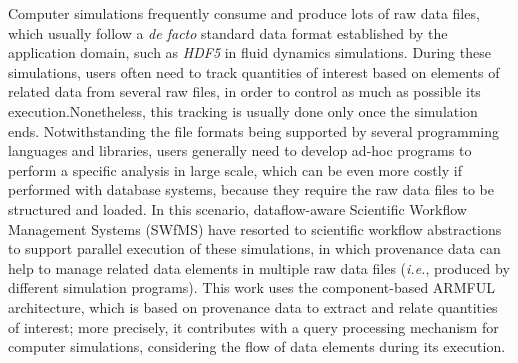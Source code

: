 \begin{foreignabstract}

Computer simulations frequently consume and produce lots of raw data files, which usually follow a \textit{de facto} standard data format established by the application domain, such as \textit{HDF5} in fluid dynamics simulations.
During these simulations, users often need to track quantities of interest based on elements of related data from several raw files, in order to control as much as possible its execution.Nonetheless, this tracking is usually done only once the simulation ends.
Notwithstanding the file formats being supported by several programming languages and libraries, users generally need to develop ad-hoc programs to perform a specific analysis in large scale, which can be even more costly if performed with database systems, because they require the raw data files to be structured and loaded. In this scenario, dataflow-aware Scientific Workflow Management Systems (SWfMS) have resorted to scientific workflow abstractions to support parallel execution of these simulations, in which provenance data can help to manage related data elements in multiple raw data files (\textit{i.e.}, produced by different simulation programs).
This work uses the component-based ARMFUL architecture, which is based on provenance data to extract and relate quantities of interest; more precisely, it contributes with a query processing mechanism for computer simulations, considering the flow of data elements during its execution.

\end{foreignabstract}

